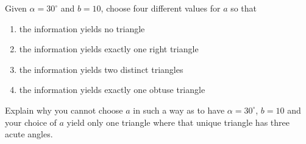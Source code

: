 { Given $\alpha = 30^{\circ}$ and $b = 10$, choose four different values for $a$ so that \begin{enumerate} \item the information yields no triangle \item the information yields exactly one right triangle \item the information yields two distinct triangles \item the information yields exactly one obtuse triangle \end{enumerate} Explain why you cannot choose $a$ in such a way as to have $\alpha = 30^{\circ}$, $b = 10$ and your choice of $a$ yield only one triangle where that unique triangle has three acute angles.}
{}
